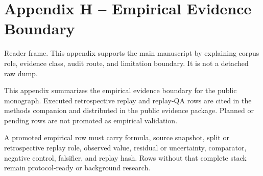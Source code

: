 \section{Appendix H -- Empirical Evidence Boundary}
Reader frame. This appendix supports the main manuscript by explaining corpus role, evidence class, audit route, and limitation boundary. It is not a detached raw dump.


\label{sec:oc-core-1-3-empirical-evidence-boundary-appendix}

This appendix summarizes the empirical evidence boundary for the public monograph. Executed retrospective replay and replay-QA rows are cited in the methods companion and distributed in the public evidence package. Planned or pending rows are not promoted as empirical validation.


A promoted empirical row must carry formula, source snapshot, split or retrospective replay role, observed value, residual or uncertainty, comparator, negative control, falsifier, and replay hash. Rows without that complete stack remain protocol-ready or background research.
